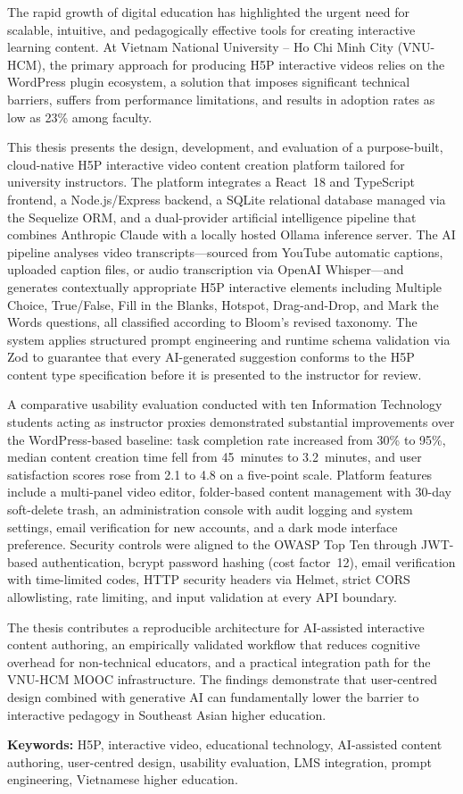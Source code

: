 The rapid growth of digital education has highlighted the urgent need for scalable,
intuitive, and pedagogically effective tools for creating interactive learning content.
At Vietnam National University -- Ho Chi Minh City (VNU-HCM), the primary approach for
producing H5P interactive videos relies on the WordPress plugin ecosystem, a solution
that imposes significant technical barriers, suffers from performance limitations, and
results in adoption rates as low as 23\% among faculty.

This thesis presents the design, development, and evaluation of a purpose-built,
cloud-native H5P interactive video content creation platform tailored for university
instructors. The platform integrates a React~18 and TypeScript frontend, a
Node.js/Express backend, a SQLite relational database managed via the Sequelize ORM,
and a dual-provider artificial intelligence pipeline that combines Anthropic Claude
with a locally hosted Ollama inference server. The AI pipeline analyses video
transcripts---sourced from YouTube automatic captions, uploaded caption files, or
audio transcription via OpenAI Whisper---and generates contextually appropriate H5P
interactive elements including Multiple Choice, True/False, Fill in the Blanks,
Hotspot, Drag-and-Drop, and Mark the Words questions, all classified according to
Bloom's revised taxonomy. The system applies structured prompt engineering and
runtime schema validation via Zod to guarantee that every AI-generated suggestion
conforms to the H5P content type specification before it is presented to the
instructor for review.

A comparative usability evaluation conducted with ten Information Technology students
acting as instructor proxies demonstrated substantial improvements over the
WordPress-based baseline: task completion rate increased from 30\% to 95\%, median
content creation time fell from 45~minutes to 3.2~minutes, and user satisfaction
scores rose from 2.1 to 4.8 on a five-point scale. Platform features include a multi-panel video editor, folder-based content
management with 30-day soft-delete trash, an administration console with
audit logging and system settings, email verification for new accounts, and
a dark mode interface preference. Security controls were aligned to the OWASP
Top Ten through JWT-based authentication, bcrypt password hashing
(cost factor~12), email verification with time-limited codes, HTTP security
headers via Helmet, strict CORS allowlisting, rate limiting, and input
validation at every API boundary.

The thesis contributes a reproducible architecture for AI-assisted interactive
content authoring, an empirically validated workflow that reduces cognitive overhead
for non-technical educators, and a practical integration path for the VNU-HCM MOOC
infrastructure. The findings demonstrate that user-centred design combined with
generative AI can fundamentally lower the barrier to interactive pedagogy in
Southeast Asian higher education.

\bigskip
\noindent
\textbf{Keywords:} H5P, interactive video, educational technology, AI-assisted
content authoring, user-centred design, usability evaluation, LMS integration,
prompt engineering, Vietnamese higher education.
